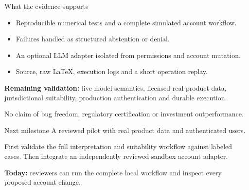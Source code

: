 \documentclass[aspectratio=169,11pt]{beamer}
\begin{document}
\begin{frame}{What the evidence supports}
\begin{itemize}
\item Reproducible numerical tests and a complete simulated account workflow.
\item Failures handled as structured abstention or denial.
\item An optional LLM adapter isolated from permissions and account mutation.
\item Source, raw LaTeX, execution logs and a short operation replay.
\end{itemize}
\vspace{5mm}
\textbf{Remaining validation:} live model semantics, licensed real-product data, jurisdictional suitability, production authentication and durable execution.\par\vspace{3mm}
\footnotesize No claim of bug freedom, regulatory certification or investment outperformance.
\end{frame}
\begin{frame}{Next milestone}
\Large A reviewed pilot with real product data and authenticated users.\par\vspace{8mm}
\normalsize First validate the full interpretation and suitability workflow against labeled cases. Then integrate an independently reviewed sandbox account adapter.\par\vspace{8mm}
\textbf{Today:} reviewers can run the complete local workflow and inspect every proposed account change.
\end{frame}
\end{document}

